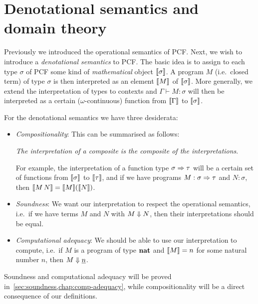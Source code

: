 \chapter[{Denotational semantics and domain theory}]{Denotational semantics and \\ domain theory}\label{chap:domains}

Previously we introduced the operational semantics of PCF. Next, we wish to
introduce a \emph{denotational semantics} to PCF. The basic idea is to assign to
each type \(\sigma\) of PCF some kind of \emph{mathematical} object
\(\llbracket\sigma\rrbracket\).
%
A program \(M\) (i.e.\ closed term) of type \(\sigma\) is then interpreted as
an element \(\llbracket M\rrbracket\) of \(\llbracket\sigma\rrbracket\).
%
More generally, we extend the interpretation of types to contexts and
\(\Gamma \vdash M : \sigma\) will then be interpreted as a certain
(\(\omega\)-continuous) function from \(\llbracket\Gamma\rrbracket\) to
\(\llbracket\sigma\rrbracket\).

For the denotational semantics we have three desiderata:

\begin{itemize}[itemsep=2mm,topsep=3mm]
\item\emph{Compositionality}: This can be summarised as follows:
  \begin{displayquote}
    \emph{The interpretation of a composite is the composite of the interpretations}.
  \end{displayquote}

  For example, the interpretation of a function type \(\sigma \Rightarrow \tau\)
  will be a certain set of functions from \(\llbracket\sigma\rrbracket\) to
  \(\llbracket\tau\rrbracket\), and if we have programs \(M : \sigma \Rightarrow \tau\) and
  \(N : \sigma\), then \(\llbracket M \, N\rrbracket = \llbracket M\rrbracket(\llbracket N\rrbracket)\).
\item\emph{Soundness}: We want our interpretation to respect the operational
  semantics, i.e.\ if we have terms \(M\) and \(N\) with
  \(M \Downarrow N\), then their interpretations should be equal.
\item\emph{Computational adequacy}: We should be able to use our
  interpretation to compute, i.e.\ if \(M\) is a program of type \(\mathtt{\mathbf{nat}}\)
  and \(\llbracket M\rrbracket = n\) for some natural number \(n\), then
  \(M \Downarrow \underline{n}\).
\end{itemize}

Soundness and computational adequacy will be proved
in~\cref{sec:soundness,chap:comp-adequacy}, while compositionality will be a
direct consequence of our definitions.

